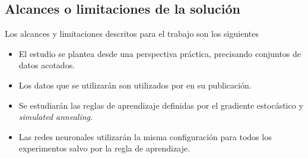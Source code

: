 \subsection{Alcances o limitaciones de la solución}
Los alcances y limitaciones descritos para el trabajo son los siguientes
\begin{itemize}
	\item El estudio se plantea desde una perspectiva práctica, precisando conjuntos de datos acotados.

    \item Los datos que se utilizarán son utilizados por  en su publicación.

	\item Se estudiarán las reglas de aprendizaje definidas por el gradiente estocástico y {\em simulated annealing}.

	\item Las redes neuronales utilizarán la misma configuración para todos los experimentos salvo por la regla de aprendizaje.
\end{itemize}
